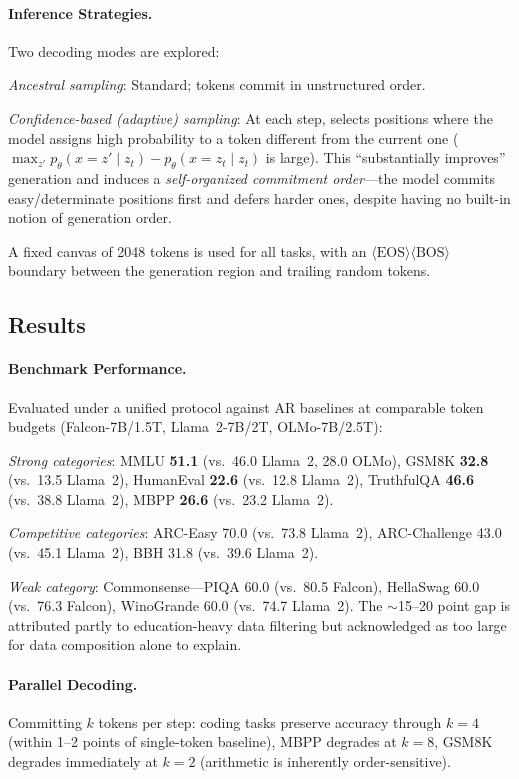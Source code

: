 \documentclass[11pt,a4paper]{article}
\begin{document}
\paragraph{Inference Strategies.} Two decoding modes are explored:

\emph{Ancestral sampling}: Standard; tokens commit in unstructured order.

\emph{Confidence-based (adaptive) sampling}: At each step, selects positions where the model assigns high probability to a token different from the current one ($\max_{z'} p_\theta(x=z' \mid z_t) - p_\theta(x=z_t \mid z_t)$ is large). This ``substantially improves'' generation and induces a \emph{self-organized commitment order}---the model commits easy/determinate positions first and defers harder ones, despite having no built-in notion of generation order.

A fixed canvas of 2048 tokens is used for all tasks, with an $\langle\mathrm{EOS}\rangle\langle\mathrm{BOS}\rangle$ boundary between the generation region and trailing random tokens.

\subsection{Results}

\paragraph{Benchmark Performance.} Evaluated under a unified protocol against AR baselines at comparable token budgets (Falcon-7B/1.5T, Llama~2-7B/2T, OLMo-7B/2.5T):

\emph{Strong categories}: MMLU \textbf{51.1} (vs.\ 46.0 Llama~2, 28.0 OLMo), GSM8K \textbf{32.8} (vs.\ 13.5 Llama~2), HumanEval \textbf{22.6} (vs.\ 12.8 Llama~2), TruthfulQA \textbf{46.6} (vs.\ 38.8 Llama~2), MBPP \textbf{26.6} (vs.\ 23.2 Llama~2).

\emph{Competitive categories}: ARC-Easy 70.0 (vs.\ 73.8 Llama~2), ARC-Challenge 43.0 (vs.\ 45.1 Llama~2), BBH 31.8 (vs.\ 39.6 Llama~2).

\emph{Weak category}: Commonsense---PIQA 60.0 (vs.\ 80.5 Falcon), HellaSwag 60.0 (vs.\ 76.3 Falcon), WinoGrande 60.0 (vs.\ 74.7 Llama~2). The $\sim$15--20 point gap is attributed partly to education-heavy data filtering but acknowledged as too large for data composition alone to explain.

\paragraph{Parallel Decoding.} Committing $k$ tokens per step: coding tasks preserve accuracy through $k=4$ (within 1--2 points of single-token baseline), MBPP degrades at $k=8$, GSM8K degrades immediately at $k=2$ (arithmetic is inherently order-sensitive).
\end{document}
